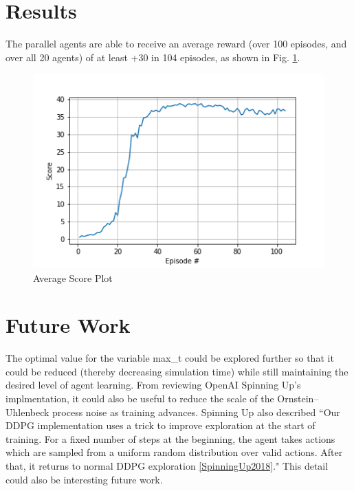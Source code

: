 \documentclass{article}
\begin{document}
\section{Results}
The parallel agents are able to receive an average reward (over 100 episodes, and over all 20 agents) of at least +30 in 104 episodes, as shown in Fig. \ref{fig:results}.

\begin{figure}[ht]
\centering
\includegraphics[scale=0.75]{./figures/results.png}
\caption{Average Score Plot}
\label{fig:results}
\end{figure}

\section{Future Work}
The optimal value for the variable max\_t could be explored further so that it could be reduced (thereby decreasing simulation time) while still maintaining the desired level of agent learning. From reviewing OpenAI Spinning Up's implmentation, it could also be useful to reduce the scale of the Ornstein–Uhlenbeck process noise as training advances. Spinning Up also described ``Our DDPG implementation uses a trick to improve exploration at the start of training. For a fixed number of steps at the beginning, the agent takes actions which are sampled from a uniform random distribution over valid actions. After that, it returns to normal DDPG exploration \ref{SpinningUp2018}." This detail could also be interesting future work. 



\end{document}
